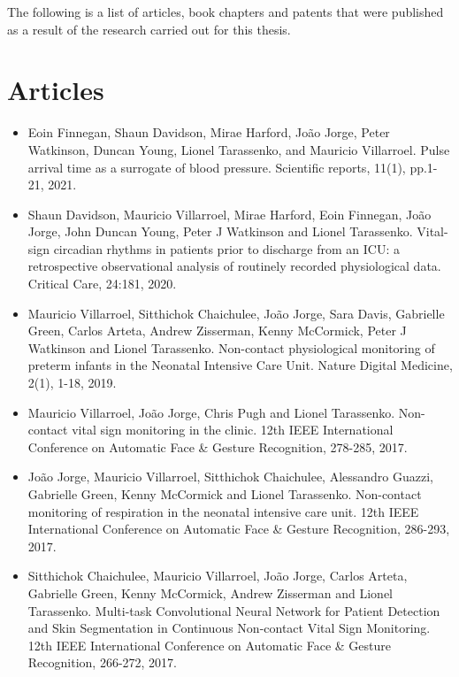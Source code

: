 The following is a list of articles, book chapters and patents that were published as a result of the research carried out for this thesis.
 
\section*{Articles}

\begin{itemize}

    \item Eoin Finnegan, Shaun Davidson, Mirae Harford, Jo\~{a}o Jorge, Peter Watkinson, Duncan Young, Lionel Tarassenko, and Mauricio Villarroel. Pulse arrival time as a surrogate of blood pressure. Scientific reports, 11(1), pp.1-21, 2021.

    \item Shaun Davidson, Mauricio Villarroel, Mirae Harford, Eoin Finnegan, Jo\~{a}o Jorge, John Duncan Young, Peter J Watkinson and Lionel Tarassenko. Vital-sign circadian rhythms in patients prior to discharge from an ICU: a retrospective observational analysis of routinely recorded physiological data. Critical Care, 24:181, 2020.

    \item Mauricio Villarroel, Sitthichok Chaichulee, Jo\~{a}o Jorge, Sara Davis, Gabrielle Green, Carlos Arteta, Andrew Zisserman, Kenny McCormick, Peter J Watkinson and Lionel Tarassenko. Non-contact physiological monitoring of preterm infants in the Neonatal Intensive Care Unit. Nature Digital Medicine, 2(1), 1-18, 2019.

    \item Mauricio Villarroel,  Jo\~{a}o Jorge, Chris Pugh and Lionel Tarassenko. Non-contact vital sign monitoring in the clinic. 12th IEEE International Conference on Automatic Face \& Gesture Recognition, 278-285, 2017.
     
    \item Jo\~{a}o Jorge, Mauricio Villarroel,  Sitthichok Chaichulee, Alessandro Guazzi,  Gabrielle Green, Kenny McCormick and Lionel Tarassenko. Non-contact monitoring of respiration in the neonatal intensive care unit. 12th IEEE International Conference on Automatic Face \& Gesture Recognition, 286-293, 2017.

    \item Sitthichok Chaichulee, Mauricio Villarroel,  Jo\~{a}o Jorge, Carlos Arteta,  Gabrielle Green,  Kenny McCormick, Andrew Zisserman and Lionel Tarassenko. Multi-task Convolutional Neural Network for Patient Detection and Skin Segmentation in Continuous Non-contact Vital Sign Monitoring. 12th IEEE International Conference on Automatic Face \& Gesture Recognition, 266-272, 2017.


\end{itemize}
